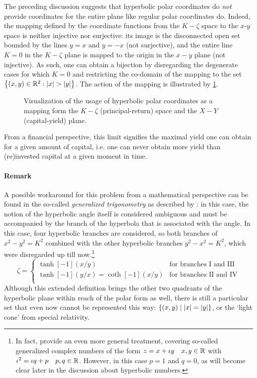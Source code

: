 The preceding discussion suggests that hyperbolic polar coordinates do \emph{not} provide coordinates for the entire plane like regular polar coordinates do. Indeed, the mapping defined by the coordinate functions from the \(K-\zeta\) space to the \(x\)-\(y\) space is neither injective nor surjective: its image is the disconnected open set bounded by the lines \(y = x\) and \(y = -x\) (not surjective), and the entire line \(K = 0\) in the \(K-\zeta\) plane is mapped to the origin in the \(x-y\) plane (not injective). As such, one can obtain a bijection by disregarding the degenerate cases for which \(K = 0\) and restricting the co-domain of the mapping to the set \(\qty{(x, y) \in \real^2: \abs{x} > \abs{y}}\). The action of the mapping is illustrated by \cref{fig:polar_coords}.
\begin{figure}[ht]
    \centering
    
    \caption{Visualization of the usage of hyperbolic polar coordinates as a mapping form the $K-\zeta$ (principal-return) space and the $X-Y$ (capital-yield) plane.}
    \label{fig:polar_coords}
\end{figure}
From a financial perspective, this limit signifies the maximal yield one can obtain for a given amount of capital, i.e. one can never obtain more yield than (re)invested capital at a given moment in time.

\paragraph{Remark} A possible workaround for this problem from a mathematical perspective can be found in the so-called \emph{generalized trigonometry} as described by \citet{Harkin2004}: in this case, the notion of the hyperbolic angle itself is considered ambiguous and must be accompanied by the branch of the hyperbola that is associated with the angle. In this case, four hyperbolic branches are considered, so both branches of \(x^2 - y^2 = K^2\) combined with the other hyperbolic branches \(y^2 - x^2 = K^2\), which were disregarded up till now.\footnote{In fact, \citeauthor{Harkin2004} provide an even more general treatment, covering so-called generalized complex numbers of the form \(z = x + \iota y\quad x, y \in \mathbb{R}\) with \(\iota^2 = \iota q + p\quad p, q \in \mathbb{R}\). However, in this case \(p = 1\) and \(q = 0\), as will become clear later in the discussion about hyperbolic numbers.}
\begin{equation}
    \zeta = 
    \begin{cases}
        \tanh[-1](x/y) & \text{for branches I and III}\\
        \tanh[-1](y/x) = \coth[-1](x/y) & \text{for branches II and IV}\\
    \end{cases}
\end{equation}
Although this extended definition brings the other two quadrants of the hyperbolic plane within reach of the polar form as well, there is still a particular set that even now cannot be represented this way: \(\qty{(x, y)\mid \abs{x} = \abs{y}}\), or the `light cone' from special relativity.

